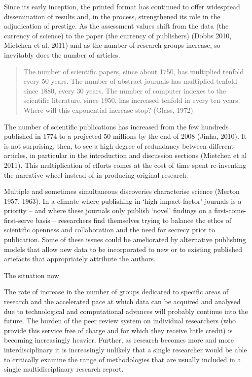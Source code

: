 \documentclass[final,authoryear,3p]{elsarticle-open-drafting}
\begin{document}
Since its early inception, the printed format has continued to offer widespread dissemination of results and, in the process, strengthened its role in the adjudication of prestige. As the assessment values shift from the data (the currency of science) to the paper (the currency of publishers) (Dobbs 2010, Mietchen et al. 2011) and as the number of research groups increase, so inevitably does the number of articles.  

\begin{quote}
The number of scientific papers, since about 1750, has multiplied tenfold every 50 years. The number of abstract journals has multiplied tenfold since 1880, every 30 years. The number of computer indexes to the scientific literature, since 1950, has increased tenfold in every ten years. Where will this exponential increase stop? (Glass, 1972)
\end{quote}

The number of scientific publications has increased from the few hundreds published in 1774 to a projected 50 millions by the end of 2008 (Jinha, 2010). It is not surprising, then, to see a high degree of redundancy between different articles, in particular in the introduction and discussion sections (Mietchen et al 2011). This multiplication of efforts comes at the cost of time spent re-inventing the narrative wheel instead of in producing original research.


Multiple and sometimes simultaneous discoveries characterise science (Merton 1957, 1963). In a climate where publishing in ‘high impact factor’ journals is a priority – and where these journals only publish ‘novel’ findings on a first-come-first-serve basis – researchers find themselves trying to balance the ethos of scientific openness and collaboration and the need for secrecy prior to publication. Some of these issues could be ameliorated by alternative publishing models that allow new data to be incorporated to new or to existing published artefacts that appropriately attribute the authors.

The situation now

The rate of increase in the number of groups dedicated to specific areas of research and the accelerated pace at which data can be acquired and analysed due to technological and computational advances will probably continue into the future. The burden of the peer review system on individual researchers (who provide this service free of charge and for which they receive little credit) is becoming increasingly heavier. Further, as research becomes more and more interdisciplinary it is increasingly unlikely that a single researcher would be able to critically examine the range of methodologies that are usually included in a single multidisciplinary research report.
\end{document}
